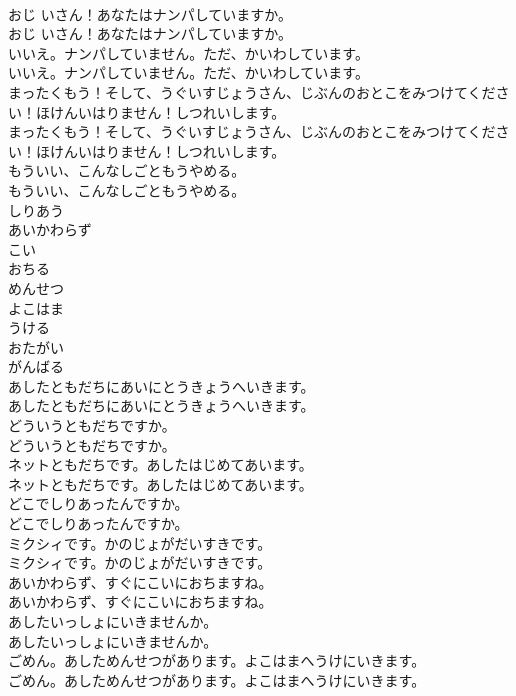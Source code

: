 \documentclass[8pt]{extreport}
\begin{document}
\begin{CJK}{UTF8}{min}
\\	おじ いさん！あなたはナンパしていますか。	
\\	おじ いさん！あなたはナンパしていますか。 
\\	いいえ。ナンパしていません。ただ、かいわしています。	
\\	いいえ。ナンパしていません。ただ、かいわしています。 
\\	まったくもう！そして、うぐいすじょうさん、じぶんのおとこをみつけてください！ほけんいはりません！しつれいします。	
\\	まったくもう！そして、うぐいすじょうさん、じぶんのおとこをみつけてください！ほけんいはりません！しつれいします。 
\\	もういい、こんなしごともうやめる。	
\\	もういい、こんなしごともうやめる。 
\\	しりあう
\\	あいかわらず
\\	こい
\\	おちる
\\	めんせつ
\\	よこはま
\\	うける
\\	おたがい
\\	がんばる
\\	あしたともだちにあいにとうきょうへいきます。	
\\	あしたともだちにあいにとうきょうへいきます。 
\\	どういうともだちですか。	
\\	どういうともだちですか。 
\\	ネットともだちです。あしたはじめてあいます。	
\\	ネットともだちです。あしたはじめてあいます。 
\\	どこでしりあったんですか。	
\\	どこでしりあったんですか。 
\\	ミクシィです。かのじょがだいすきです。	
\\	ミクシィです。かのじょがだいすきです。 
\\	あいかわらず、すぐにこいにおちますね。	
\\	あいかわらず、すぐにこいにおちますね。 
\\	あしたいっしょにいきませんか。	
\\	あしたいっしょにいきませんか。 
\\	ごめん。あしためんせつがあります。よこはまへうけにいきます。	
\\	ごめん。あしためんせつがあります。よこはまへうけにいきます。 

\end{CJK}
\end{document}
